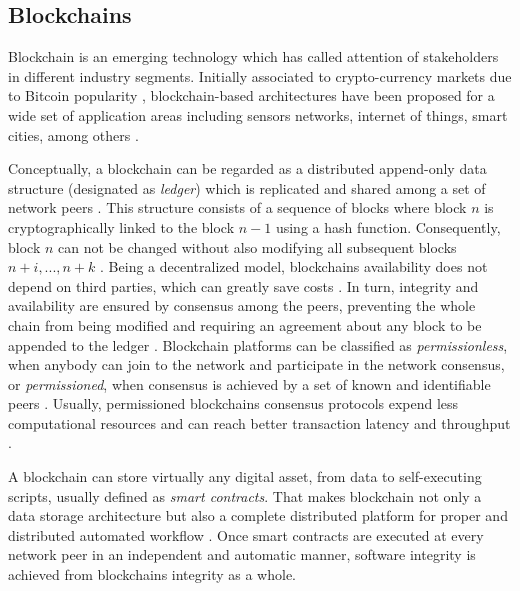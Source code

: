 \documentclass[journal]{IEEEtran}
\begin{document}
\subsection{Blockchains}
Blockchain is an emerging technology which has called attention of stakeholders in different industry segments. 
Initially associated to crypto-currency markets due to Bitcoin popularity \cite{Zheng2017}, blockchain-based architectures have been proposed for a wide set of application areas including sensors networks, internet of things, smart cities, among others \cite{Zheng2017,Christidis2016}. 

Conceptually, a blockchain can be regarded as a distributed append-only data structure (designated as \emph{ledger}) which is replicated and shared among a set of network peers \cite{Christidis2016}. 
This structure consists of a sequence of blocks where block $n$ is cryptographically linked to the block $n-1$ using a hash function.
Consequently, block $n$ can not be changed without also modifying all subsequent blocks $n + i, ..., n + k$ \cite{Sousa2018}. 
Being a decentralized model, blockchains availability does not depend on third parties, which can greatly save costs \cite{Zheng2017}.
In turn, integrity and availability are ensured by consensus among the peers, preventing the whole chain from being modified and requiring an agreement about any block to be appended to the ledger \cite{Sousa2018,Vukolic2016}.
Blockchain platforms can be classified as \emph{permissionless}, when anybody can join to the network and participate in the network consensus, or \emph{permissioned}, when consensus is achieved by a set of known and identifiable peers \cite{Vukolic2016}. Usually, permissioned blockchains consensus protocols expend less computational resources and can reach better transaction latency and throughput \cite{Sousa2018}.

A blockchain can store virtually any digital asset, from data to self-executing scripts, usually defined as \emph{smart contracts}. %
That makes blockchain not only a data storage architecture but also a complete distributed platform for proper and distributed automated workflow \cite{Christidis2016}. 
Once smart contracts are executed at every network peer in an independent and automatic manner, software integrity is achieved from blockchains integrity as a whole. 
\end{document}
